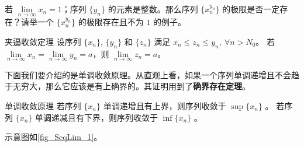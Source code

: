 \begin{exercise}{}
  若 $\lim\limits_{n\rightarrow \infty} x_n=1$；序列 $\{y_n\}$ 的元素是整数。那么序列 $\{x_n^{y_n}\}$  的极限是否一定存在？请举一个 $\{x_n^{y_n}\}$ 的极限存在且不为 $1$ 的例子。
\end{exercise}

\begin{theorem}{夹逼收敛定理}
  设序列 $\{x_n\}$, $\{y_n\}$ 和 $\{z_n\}$ 满足 $x_n\leq z_n\leq y_n,\ \forall n>N_0$。
若 $\lim\limits_{n\rightarrow \infty}x_n=\lim\limits_{n\rightarrow \infty}y_n=a$，则 $\lim\limits_{n\rightarrow \infty}z_n=a$。
\end{theorem}
下面我们要介绍的是单调收敛原理。从直观上看，如果一个序列单调递增且不会趋于无穷大，那么它应该是有上确界的。其证明用到了\textbf{确界存在定理}。

\begin{theorem}{单调收敛原理}
若序列 $\{x_n\}$ 单调递增且有上界，则序列收敛于 $\sup \{x_n\}$ 。
若序列 $\{x_n\}$ 单调递减且有下界，则序列收敛于 $\inf\{x_n\}$ 。
\end{theorem}
示意图如\autoref{fig_SeqLim_1}。
